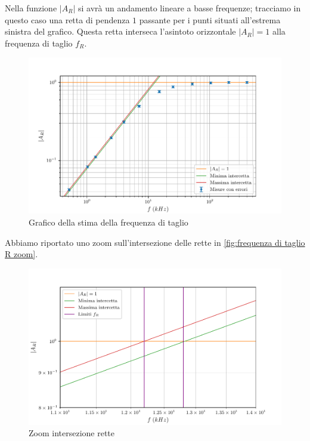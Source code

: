\documentclass[11pt, a4paper]{article}
\numberwithin{equation}{section} %
\begin{document}
\newpage

Nella funzione $|A_{R}|$ si avrà un andamento lineare a basse frequenze; tracciamo in questo caso una retta di pendenza $1$ passante per i punti situati all'estrema sinistra del grafico. Questa retta interseca l'asintoto orizzontale $|A_{R}| = 1$ alla frequenza di taglio $f_{R}$.

\begin{figure}[ht!]
    \includegraphics{onda_sin_AR(f)_taglio.pdf}
    \caption{Grafico della stima della frequenza di taglio}
    \label{fig:frequenza di taglio R}
\end{figure}

\newpage

Abbiamo riportato uno zoom sull'intersezione delle rette in \autoref{fig:frequenza di taglio R zoom}.

\begin{figure}[ht!]
    \includegraphics{onda_sin_AR(f)_taglio_frequenza.pdf}
    \caption{Zoom intersezione rette}
    \label{fig:frequenza di taglio R zoom}
\end{figure}
\end{document}
